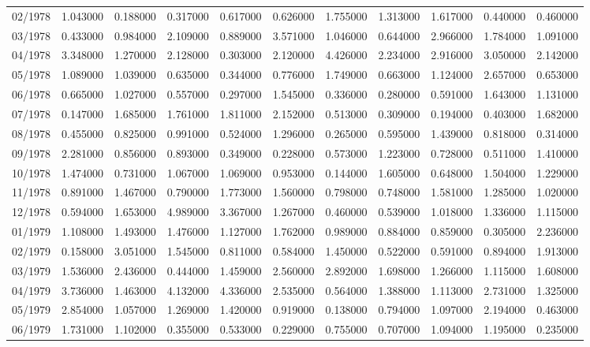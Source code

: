 \begin{tabular}{lrrrrrrrrrr}
02/1978 & 1.043000 & 0.188000 & 0.317000 & 0.617000 & 0.626000 & 1.755000 & 1.313000 & 1.617000 & 0.440000 & 0.460000 \\
03/1978 & 0.433000 & 0.984000 & 2.109000 & 0.889000 & 3.571000 & 1.046000 & 0.644000 & 2.966000 & 1.784000 & 1.091000 \\
04/1978 & 3.348000 & 1.270000 & 2.128000 & 0.303000 & 2.120000 & 4.426000 & 2.234000 & 2.916000 & 3.050000 & 2.142000 \\
05/1978 & 1.089000 & 1.039000 & 0.635000 & 0.344000 & 0.776000 & 1.749000 & 0.663000 & 1.124000 & 2.657000 & 0.653000 \\
06/1978 & 0.665000 & 1.027000 & 0.557000 & 0.297000 & 1.545000 & 0.336000 & 0.280000 & 0.591000 & 1.643000 & 1.131000 \\
07/1978 & 0.147000 & 1.685000 & 1.761000 & 1.811000 & 2.152000 & 0.513000 & 0.309000 & 0.194000 & 0.403000 & 1.682000 \\
08/1978 & 0.455000 & 0.825000 & 0.991000 & 0.524000 & 1.296000 & 0.265000 & 0.595000 & 1.439000 & 0.818000 & 0.314000 \\
09/1978 & 2.281000 & 0.856000 & 0.893000 & 0.349000 & 0.228000 & 0.573000 & 1.223000 & 0.728000 & 0.511000 & 1.410000 \\
10/1978 & 1.474000 & 0.731000 & 1.067000 & 1.069000 & 0.953000 & 0.144000 & 1.605000 & 0.648000 & 1.504000 & 1.229000 \\
11/1978 & 0.891000 & 1.467000 & 0.790000 & 1.773000 & 1.560000 & 0.798000 & 0.748000 & 1.581000 & 1.285000 & 1.020000 \\
12/1978 & 0.594000 & 1.653000 & 4.989000 & 3.367000 & 1.267000 & 0.460000 & 0.539000 & 1.018000 & 1.336000 & 1.115000 \\
01/1979 & 1.108000 & 1.493000 & 1.476000 & 1.127000 & 1.762000 & 0.989000 & 0.884000 & 0.859000 & 0.305000 & 2.236000 \\
02/1979 & 0.158000 & 3.051000 & 1.545000 & 0.811000 & 0.584000 & 1.450000 & 0.522000 & 0.591000 & 0.894000 & 1.913000 \\
03/1979 & 1.536000 & 2.436000 & 0.444000 & 1.459000 & 2.560000 & 2.892000 & 1.698000 & 1.266000 & 1.115000 & 1.608000 \\
04/1979 & 3.736000 & 1.463000 & 4.132000 & 4.336000 & 2.535000 & 0.564000 & 1.388000 & 1.113000 & 2.731000 & 1.325000 \\
05/1979 & 2.854000 & 1.057000 & 1.269000 & 1.420000 & 0.919000 & 0.138000 & 0.794000 & 1.097000 & 2.194000 & 0.463000 \\
06/1979 & 1.731000 & 1.102000 & 0.355000 & 0.533000 & 0.229000 & 0.755000 & 0.707000 & 1.094000 & 1.195000 & 0.235000 \\

\end{tabular}
